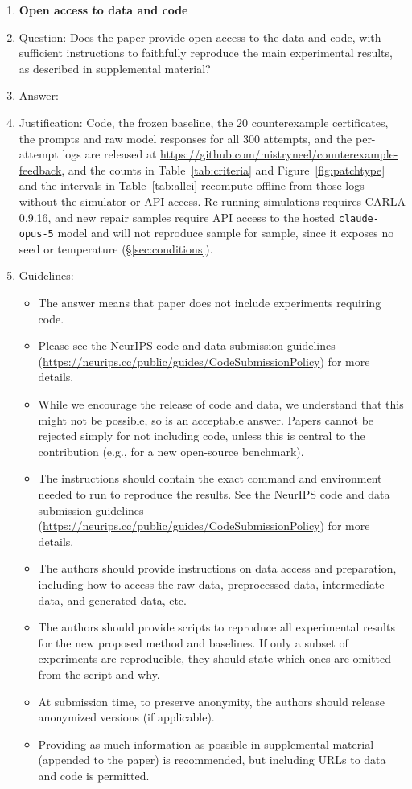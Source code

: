 \begin{enumerate}
\item {\bf Open access to data and code}
    \item[] Question: Does the paper provide open access to the data and code, with sufficient instructions to faithfully reproduce the main experimental results, as described in supplemental material?
    \item[] Answer: \answerYes{}
    \item[] Justification: Code, the frozen baseline, the 20 counterexample certificates, the prompts and raw model responses for all 300 attempts, and the per-attempt logs are released at \url{https://github.com/mistryneel/counterexample-feedback},
    and the counts in Table~\ref{tab:criteria} and Figure~\ref{fig:patchtype} and the intervals in Table~\ref{tab:allci} recompute offline from those logs without the simulator or API access. Re-running simulations requires CARLA 0.9.16, and new repair samples require API access to the hosted \texttt{claude-opus-5} model and will not reproduce sample for sample, since it exposes no seed or temperature (\S\ref{sec:conditions}).
    \item[] Guidelines:
    \begin{itemize}
        \item The answer \answerNA{} means that paper does not include experiments requiring code.
        \item Please see the NeurIPS code and data submission guidelines (\url{https://neurips.cc/public/guides/CodeSubmissionPolicy}) for more details.
        \item While we encourage the release of code and data, we understand that this might not be possible, so \answerNo{} is an acceptable answer. Papers cannot be rejected simply for not including code, unless this is central to the contribution (e.g., for a new open-source benchmark).
        \item The instructions should contain the exact command and environment needed to run to reproduce the results. See the NeurIPS code and data submission guidelines (\url{https://neurips.cc/public/guides/CodeSubmissionPolicy}) for more details.
        \item The authors should provide instructions on data access and preparation, including how to access the raw data, preprocessed data, intermediate data, and generated data, etc.
        \item The authors should provide scripts to reproduce all experimental results for the new proposed method and baselines. If only a subset of experiments are reproducible, they should state which ones are omitted from the script and why.
        \item At submission time, to preserve anonymity, the authors should release anonymized versions (if applicable).
        \item Providing as much information as possible in supplemental material (appended to the paper) is recommended, but including URLs to data and code is permitted.
    \end{itemize}


\end{enumerate}
